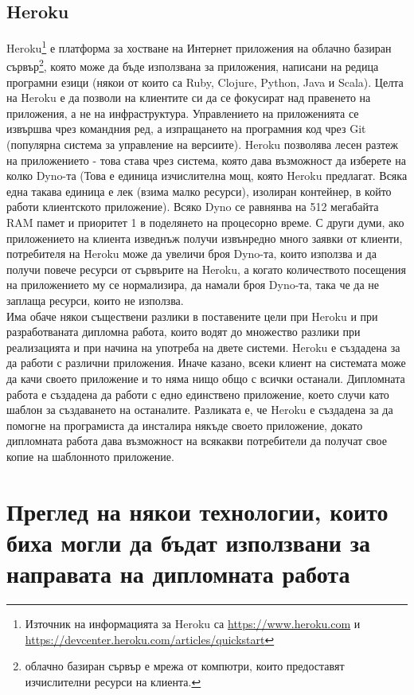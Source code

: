 \documentclass[pdftex,12pt,a4paper]{report}
\begin{document}
\subsection {Heroku}
Heroku\footnote[1]{Източник на информацията за Heroku са \url{https://www.heroku.com} и \\\url{https://devcenter.heroku.com/articles/quickstart}} е платформа за хостване на Интернет приложения на облачно базиран сървър\footnote[2]{облачно базиран сървър е мрежа от компютри, които предоставят изчислителни ресурси на клиента.}, която може да бъде използвана за приложения, написани на редица програмни езици (някои от които са Ruby, Clojure, Python, Java и Scala). Целта на Heroku е да позволи на клиентите си да се фокусират над правенето на приложения, а не на инфраструктура. Управлението на приложенията се извършва чрез командния ред, а изпращането на програмния код чрез Git (популярна система за управление на версиите). Heroku позволява лесен разтеж на приложението - това става чрез система, която дава възможност да изберете на колко Dyno-та (Това е единица изчислителна мощ, която Heroku предлагат. Всяка една такава единица е лек (взима малко ресурси), изолиран контейнер, в който работи клиентското приложение). Всяко Dyno се равнянва на 512 мегабайта RAM памет и приоритет 1 в поделянето на процесорно време. С други думи, ако приложението на клиента изведнъж получи извънредно много заявки от клиенти, потребителя на Heroku може да увеличи броя Dyno-та, които използва и да получи повече ресурси от сървърите на Heroku, а когато количеството посещения на приложението му се нормализира, да намали броя Dyno-та, така че да не заплаща ресурси, които не използва.\\
Има обаче някои съществени разлики в поставените цели при Heroku и при разработваната дипломна работа, които водят до множество разлики при реализацията и при начина на употреба на двете системи. Heroku е създадена за да работи с различни приложения. Иначе казано, всеки клиент на системата може да качи своето приложение и то няма нищо общо с всички останали. Дипломната работа е създадена да работи с едно единствено приложение, което случи като шаблон за създаването на останалите. Разликата е, че Heroku е създадена за да помогне на програмиста да инсталира някъде своето приложение, докато дипломната работа дава възможност на всякакви потребители да получат свое копие на шаблонното приложение.
\section {Преглед на някои технологии, които биха могли да бъдат използвани за направата на дипломната работа}
\end{document}
